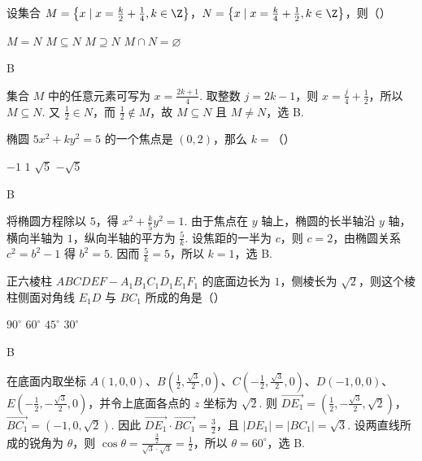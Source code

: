 \begin{problem}
设集合 \(M = \left\{x \mid x = \frac{k}{2} + \frac{1}{4}, k \in \Z\right\}\)，\(N = \left\{x \mid x = \frac{k}{4} + \frac{1}{2}, k \in \Z\right\}\)，则（\quad）

\choices
    {\(M = N\)}
    {\(M \subseteq N\)}
    {\(M \supseteq N\)}
    {\(M \cap N = \varnothing\)}
\end{problem}

\begin{answer}
B
\end{answer}

\begin{solution}
集合 \(M\) 中的任意元素可写为 \(x=\frac{2k+1}{4}\). 取整数 \(j=2k-1\)，则 \(x=\frac{j}{4}+\frac{1}{2}\)，所以 \(M\subseteq N\). 又 \(\frac{1}{2}\in N\)，而 \(\frac{1}{2}\notin M\)，故 \(M\subseteq N\) 且 \(M\neq N\)，选 B.
\end{solution}

\begin{problem}
椭圆 \(5x^{2} + ky^{2} = 5\) 的一个焦点是 \((0,2)\)，那么 \(k =\)（\quad）

\choices
    {\(-1\)}
    {\(1\)}
    {\(\sqrt{5}\)}
    {\(-\sqrt{5}\)}
\end{problem}

\begin{answer}
B
\end{answer}

\begin{solution}
将椭圆方程除以 \(5\)，得 \(x^2+\frac{k}{5}y^2=1\). 由于焦点在 \(y\) 轴上，椭圆的长半轴沿 \(y\) 轴，横向半轴为 \(1\)，纵向半轴的平方为 \(\frac{5}{k}\). 设焦距的一半为 \(c\)，则 \(c=2\)，由椭圆关系 \(c^2=b^2-1\) 得 \(b^2=5\). 因而 \(\frac{5}{k}=5\)，所以 \(k=1\)，选 B.
\end{solution}

\begin{problem}
正六棱柱 \(ABCDEF - A_{1}B_{1}C_{1}D_{1}E_{1}F_{1}\) 的底面边长为 \(1\)，侧棱长为 \(\sqrt{2}\)，则这个棱柱侧面对角线 \(E_{1}D\) 与 \(BC_{1}\) 所成的角是（\quad）

\choices
    {\(90^{\circ}\)}
    {\(60^{\circ}\)}
    {\(45^{\circ}\)}
    {\(30^{\circ}\)}
\end{problem}

\begin{answer}
B
\end{answer}

\begin{solution}
在底面内取坐标 \(A(1,0,0)\)、\(B\left(\frac12,\frac{\sqrt3}{2},0\right)\)、\(C\left(-\frac12,\frac{\sqrt3}{2},0\right)\)、\(D(-1,0,0)\)、\(E\left(-\frac12,-\frac{\sqrt3}{2},0\right)\)，并令上底面各点的 \(z\) 坐标为 \(\sqrt2\). 则
\(\overrightarrow{DE_1}=\left(\frac12,-\frac{\sqrt3}{2},\sqrt2\right)\)，\(\overrightarrow{BC_1}=(-1,0,\sqrt2)\). 因此
\(\overrightarrow{DE_1}\cdot\overrightarrow{BC_1}=\frac32\)，且 \(|DE_1|=|BC_1|=\sqrt3\).
设两直线所成的锐角为 \(\theta\)，则 \(\cos\theta=\frac{\frac{3}{2}}{\sqrt3\cdot\sqrt3}=\frac12\)，所以 \(\theta=60^{\circ}\)，选 B.
\end{solution}

